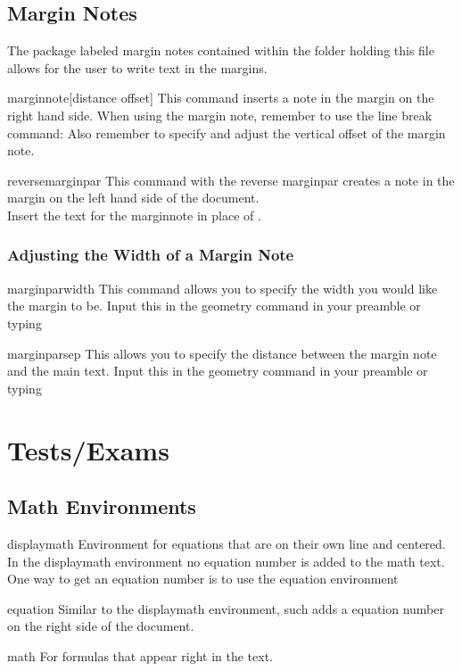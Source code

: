 	\subsection{Margin Notes}
	The package labeled margin notes contained within the folder holding this file allows for the user to write text in the margins.
		\begin{docCommand}{marginnote}{[distance offset]}
				This command inserts a note in the margin on the right hand side. When using the margin note, remember to use the line break command: %
				Also remember to specify and adjust the vertical offset of the margin note.
		\end{docCommand}
		\begin{docCommand}{reversemarginpar}{}
				This command with the reverse marginpar creates a note in the margin on the left hand side of the document.\\
				Insert the text for the marginnote in place of .
		\end{docCommand}
		\subsubsection{Adjusting the Width of a Margin Note}
			\begin{docCommand}{marginparwidth}{}
					This command allows you to specify the width you would like the margin to be. Input this in the geometry command in your preamble or typing 
			\end{docCommand}
			\begin{docCommand}{marginparsep}{}
					This allows you to specify the distance between the margin note and the main text. Input this in the geometry command in your preamble or typing 
			\end{docCommand}
\newpage
\section{Tests/Exams}	
\vspace{10.5cm}	
	\subsection{Math Environments}\label{subsec:mathenvironments}
		\begin{docEnvironment}{displaymath}{}
			Environment for equations that are on their own line and centered. In the displaymath environment no equation number is added to the math text. One way to get an equation number is to use the equation environment
		\end{docEnvironment}
		\begin{docEnvironment}{equation}{}
			Similar to the displaymath environment, such adds a equation number on the right side of the document.
		\end{docEnvironment}	
		\begin{docEnvironment}{math}{}
			For formulas that appear right in the text. 
		\end{docEnvironment}
